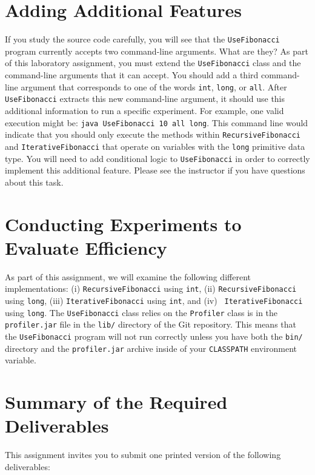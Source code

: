 \section*{Adding Additional Features}

If you study the source code carefully, you will see that the {\tt UseFibonacci} program currently accepts two
command-line arguments. What are they? As part of this laboratory assignment, you must extend the {\tt UseFibonacci}
class and the command-line arguments that it can accept. You should add a third command-line argument that corresponds
to one of the words {\tt int}, {\tt long}, or {\tt all}. After {\tt UseFibonacci} extracts this new command-line
argument, it should use this additional information to run a specific experiment. For example, one valid execution might
be: {\tt java UseFibonacci 10 all long}. This command line would indicate that you should only execute the methods
within {\tt RecursiveFibonacci} and {\tt IterativeFibonacci} that operate on variables with the {\tt long} primitive
data type.  You will need to add conditional logic to {\tt UseFibonacci} in order to correctly implement this additional
feature. Please see the instructor if you have questions about this task.

\section*{Conducting Experiments to Evaluate Efficiency}

\begin{sloppypar}
As part of this assignment, we will examine the following different implementations: (i) {\tt RecursiveFibonacci} using
{\tt int}, (ii) {\tt RecursiveFibonacci} using {\tt long}, (iii) {\tt IterativeFibonacci} using {\tt int}, and (iv) {\tt
  IterativeFibonacci} using {\tt long}. The {\tt UseFibonacci} class relies on the {\tt Profiler} class is in the {\tt
  profiler.jar} file in the {\tt lib/} directory of the Git repository.  This means that the {\tt UseFibonacci} program
will not run correctly unless you have both the {\tt bin/} directory and the {\tt profiler.jar} archive inside of your
{\tt CLASSPATH} environment variable.
\end{sloppypar}

\section*{Summary of the Required Deliverables}

  This assignment invites you to submit one printed version of the following deliverables: 

